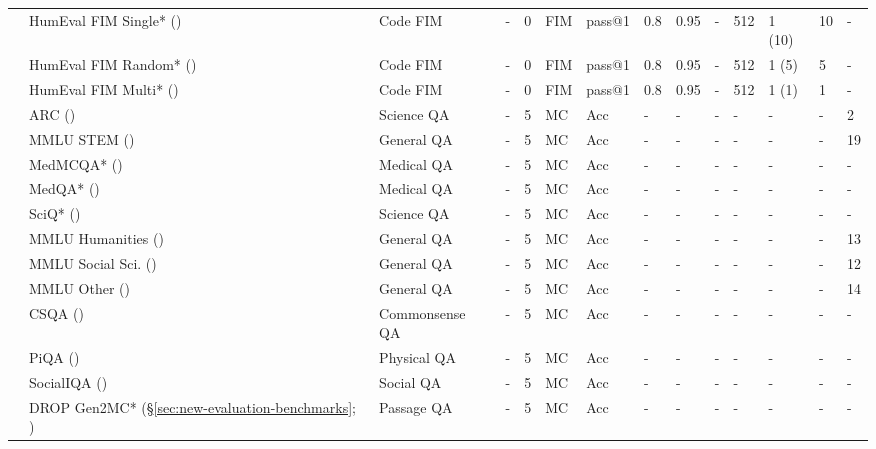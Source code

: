 \documentclass[table]{ai2style/ai2}
\begin{document}
{{\begin{table}[t]
\begin{scriptsize}
{\begin{tabular}{llHHlllllHllHl}
 & HumEval FIM Single* (\citeyear{bavarian2022efficient}) & Code FIM & - & 0 & FIM & pass@1 & 0.8 & 0.95 & - & 512 & 1 (10) & 10 & - \\
 & HumEval FIM Random* (\citeyear{bavarian2022efficient}) & Code FIM & - & 0 & FIM & pass@1 & 0.8 & 0.95 & - & 512 & 1 (5) & 5 & - \\
  & HumEval FIM Multi* (\citeyear{bavarian2022efficient}) & Code FIM & - & 0 & FIM & pass@1 & 0.8 & 0.95 & - & 512 & 1 (1) & 1 & - \\
 & ARC (\citeyear{clark2018think}) & Science QA & - & 5 & MC & Acc & - & - & - & - & - & - & 2 \\
 & MMLU STEM (\citeyear{hendryckstest2021}) & General QA & - & 5 & MC & Acc & - & - & - & - & - & - & 19 \\
 & MedMCQA* (\citeyear{pmlr-v174-pal22a}) & Medical QA & - & 5 & MC & Acc & - & - & - & - & - & - & - \\
 & MedQA* (\citeyear{jin2021disease}) & Medical QA & - & 5 & MC & Acc & - & - & - & - & - & - & - \\
  & SciQ* (\citeyear{welbl-etal-2017-crowdsourcing}) & Science QA & - & 5 & MC & Acc & - & - & - & - & - & - & - \\
 & MMLU Humanities (\citeyear{hendryckstest2021}) & General QA & - & 5 & MC & Acc & - & - & - & - & - & - & 13 \\
 & MMLU Social Sci. (\citeyear{hendryckstest2021}) & General QA & - & 5 & MC & Acc & - & - & - & - & - & - & 12 \\
 & MMLU Other (\citeyear{hendryckstest2021}) & General QA & - & 5 & MC & Acc & - & - & - & - & - & - & 14 \\
 & CSQA (\citeyear{talmor-etal-2019-commonsenseqa}) & Commonsense QA & - & 5 & MC & Acc & - & - & - & - & - & - & - \\
 & PiQA (\citeyear{Bisk_Zellers_Le_bras_Gao_Choi_2020}) & Physical QA & - & 5 & MC & Acc & - & - & - & - & - & - & - \\
 & SocialIQA (\citeyear{sap-etal-2019-social}) & Social QA & - & 5 & MC & Acc & - & - & - & - & - & - & - \\
 & DROP Gen2MC* (\S\ref{sec:new-evaluation-benchmarks}; \citeyear{dua-etal-2019-drop}) & Passage QA & - & 5 & MC & Acc & - & - & - & - & - & - & - \\

\end{tabular}}
\end{scriptsize}
\end{table}}}
\end{document}
